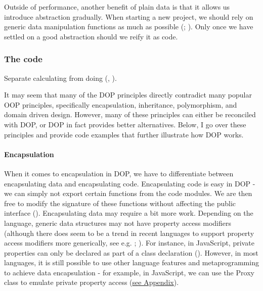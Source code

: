 \documentclass[
]{book}
\theoremstyle{definition}
\theoremstyle{definition}
\theoremstyle{definition}
\theoremstyle{definition}
\theoremstyle{remark}
\begin{document}
Outside of performance, another benefit of plain data is that it allows us introduce abstraction gradually. When starting a new project, we should rely on generic data manipulation functions as much as possible (; ). Only once we have settled on a good abstraction should we reify it as code.

\subsubsection{The code}\label{the-code}

Separate calculating from doing (, ).

It may seem that many of the DOP principles directly contradict many popular OOP principles, specifically encapsulation, inheritance, polymorphism, and domain driven design. However, many of these principles can either be reconciled with DOP, or DOP in fact provides better alternatives. Below, I go over these principles and provide code examples that further illustrate how DOP works.

\paragraph{Encapsulation}\label{encapsulation-1}

When it comes to encapsulation in DOP, we have to differentiate between encapsulating data and encapsulating code. Encapsulating code is easy in DOP - we can simply not export certain functions from the code modules. We are then free to modify the signature of these functions without affecting the public interface (). Encapsulating data may require a bit more work. Depending on the language, generic data structures may not have property access modifiers (although there does seem to be a trend in recent languages to support property access modifiers more generically, see e.g. ; ). For instance, in JavaScript, private properties can only be declared as part of a class declaration (). However, in most languages, it is still possible to use other language features and metaprogramming to achieve data encapsulation - for example, in JavaScript, we can use the Proxy class to emulate private property access (\hyperref[dop-encapsulation]{see Appendix}).
\end{document}
